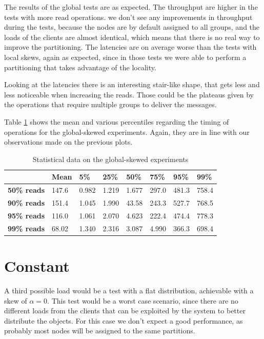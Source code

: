 The results of the global tests are as expected. The throughput are higher in the tests with more read operations. we don't see any improvements in throughput during the tests, because the nodes are by default assigned to all groups, and the loads of the clients are almost identical, which means that there is no real way to improve the partitioning. The latencies are on average worse than the tests with local skews, again as expected, since in those tests we were able to perform a partitioning that takes advantage of the locality.

Looking at the latencies there is an interesting stair-like shape, that gets less and less noticeable when increasing the reads. Those could be the plateaus given by the operations that require multiple groups to deliver the messages.

Table \ref{tab:global-latencies-table} shows the mean and various percentiles regarding the timing of operations for the global-skewed experiments. Again, they are in line with our observations made on the previous plots.

\begin{table}[!htb]
  \centering
  \begin{tabular}{l l l l l l l l}
    \hline
    & \textbf{Mean} & \textbf{5\%} & \textbf{25\%} & \textbf{50\%} & \textbf{75\%} & \textbf{95\%}& \textbf{99\%} \\
    \hline
    \textbf{50\% reads} & 147.6 & 0.982 & 1.219 & 1.677 & 297.0 & 481.3 & 758.4 \\
    \textbf{90\% reads} & 151.4 & 1.045 & 1.990 & 43.58 & 243.3 & 527.7 & 768.5 \\
    \textbf{95\% reads} & 116.0 & 1.061 & 2.070 & 4.623 & 222.4 & 474.4 & 778.3 \\
    \textbf{99\% reads} & 68.02 & 1.340 & 2.316 & 3.087 & 4.990 & 366.3 & 698.4 \\
    \hline
  \end{tabular}
  \caption{Statistical data on the global-skewed experiments}\label{tab:global-latencies-table}
\end{table}

\section{Constant}\label{sec:constant}
A third possible load would be a test with a flat distribution, achievable with a skew of $\alpha = 0$. This test would be a worst case scenario, since there are no different loads from the clients that can be exploited by the system to better distribute the objects. For this case we don't expect a good performance, as probably most nodes will be assigned to the same partitions.


